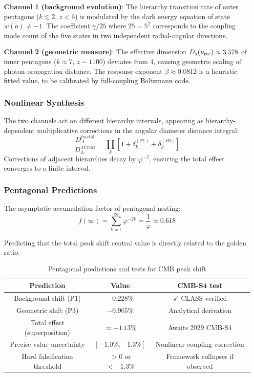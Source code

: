 \documentclass[12pt,a4paper,twocolumn]{article}
\renewcommand{\phi}{\varphi}
\begin{document}
\textbf{Channel 1 (background evolution)}: The hierarchy transition rate of outer pentagons ($k \lesssim 2$, $z < 6$) is modulated by the dark energy equation of state $w(a) \neq -1$. The coefficient $\gamma/25$ where $25=5^2$ corresponds to the coupling mode count of the five states in two independent radial-angular directions.

\textbf{Channel 2 (geometric measure)}: The effective dimension $D_s(\nu_{\rm rec}) \approx 3.578$ of inner pentagons ($k \approx 7$, $z \sim 1100$) deviates from 4, causing geometric scaling of photon propagation distance. The response exponent $\beta \approx 0.0812$ is a heuristic fitted value, to be calibrated by full-coupling Boltzmann code.

\subsubsection{Nonlinear Synthesis}

The two channels act on different hierarchy intervals, appearing as hierarchy-dependent multiplicative corrections in the angular diameter distance integral:
\begin{equation}
\frac{D_A^{\text{fractal}}}{D_A^{\Lambda\text{CDM}}} = \prod_{k} \left[1+\delta_k^{(P1)}+\delta_k^{(P3)}\right]
\end{equation}
Corrections of adjacent hierarchies decay by $\phi^{-2}$, ensuring the total effect converges to a finite interval.

\subsubsection{Pentagonal Predictions}

The asymptotic accumulation factor of pentagonal nesting:
\begin{equation}
f(\infty) = \sum_{k=1}^{\infty}\phi^{-2k} = \frac{1}{\phi} \approx 0.618
\end{equation}

Predicting that the total peak shift central value is directly related to the golden ratio.

\begin{table}[H]
\centering
\footnotesize
\caption{Pentagonal predictions and tests for CMB peak shift}
\begin{tabular}{c|c|c}
\hline
\textbf{Prediction} & \textbf{Value} & \textbf{CMB-S4 test} \\
\hline
Background shift (P1) & $-0.228\%$ & $\checkmark$ CLASS verified \\
Geometric shift (P3) & $-0.905\%$ & Analytical derivation \\
Total effect (superposition) & $\approx -1.13\%$ & Awaits 2029 CMB-S4 \\
Precise value uncertainty & $[-1.0\%, -1.3\%]$ & Nonlinear coupling correction \\
Hard falsification threshold & $>0$ or $<-1.3\%$ & Framework collapses if observed \\
\hline
\end{tabular}
\end{table}
\end{document}
